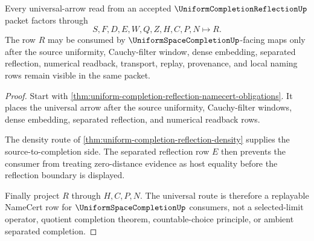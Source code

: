 \begin{theorem}
\label{thm:uniform-completion-reflection-universal-route}
Every universal-arrow read from an accepted $\UniformCompletionReflectionUp$ packet factors through
$$
S,F,D,E,W,Q,Z,H,C,P,N \longmapsto R .
$$
The row $R$ may be consumed by $\UniformSpaceCompletionUp$-facing maps only after the source uniformity, Cauchy-filter window, dense embedding, separated reflection, numerical readback, transport, replay, provenance, and local naming rows remain visible in the same packet.
\end{theorem}
\begin{proof}
Start with \autoref{thm:uniform-completion-reflection-namecert-obligations}. It places the universal arrow after the source uniformity, Cauchy-filter windows, dense embedding, separated reflection, and numerical readback rows.

The density route of \autoref{thm:uniform-completion-reflection-density} supplies the source-to-completion side. The separated reflection row $E$ then prevents the consumer from treating zero-distance evidence as host equality before the reflection boundary is displayed.

Finally project $R$ through $H,C,P,N$. The universal route is therefore a replayable NameCert row for $\UniformSpaceCompletionUp$ consumers, not a selected-limit operator, quotient completion theorem, countable-choice principle, or ambient separated completion.
\end{proof}





